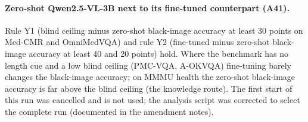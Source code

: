 \paragraph{Zero-shot Qwen2.5-VL-3B next to its fine-tuned counterpart (A41).}
\begin{center}
\footnotesize
\setlength{\tabcolsep}{3pt}
\end{center}
Rule Y1 (blind ceiling minus zero-shot black-image accuracy at least 30 points on Med-CMR and OmniMedVQA) and rule Y2 (fine-tuned minus zero-shot black-image accuracy at least 40 and 20 points) hold.
Where the benchmark has no length cue and a low blind ceiling (PMC-VQA, A-OKVQA) fine-tuning barely changes the black-image accuracy; on MMMU health the zero-shot black-image accuracy is far above the blind ceiling (the knowledge route).
The first start of this run was cancelled and is not used; the analysis script was corrected to select the complete run (documented in the amendment notes).

